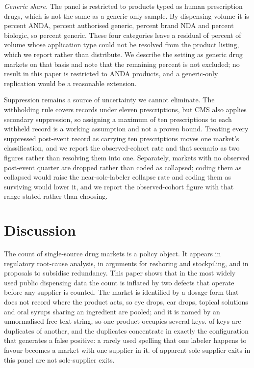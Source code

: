 \documentclass[pdflatex,sn-vancouver-num,Numbered]{sn-jnl}
\begin{document}
\emph{Generic share.} The panel is restricted to products typed as human prescription drugs,
which is not the same as a generic-only sample. By dispensing volume it is \nAndaShare percent
ANDA, \nAuthGenShare percent authorised generic, \nBrandShare percent brand NDA and
\nBiologicShare percent biologic, so \nGenericShare percent generic. These four categories leave
a residual of \nTypeResidual percent of volume whose application type could not be resolved from
the product listing, which we report rather than distribute. We describe the setting as generic
drug markets on that basis and note that the remaining \nNonGeneric percent is not excluded; no
result in this paper is restricted to ANDA products, and a generic-only replication would be a
reasonable extension.

Suppression remains a source of uncertainty we cannot eliminate. The withholding rule covers
records under eleven prescriptions, but CMS also applies secondary suppression, so assigning a
maximum of ten prescriptions to each withheld record is a working assumption and not a proven
bound. Treating every suppressed post-event record as carrying ten prescriptions moves one
market's classification, and we report the observed-cohort rate and that scenario as two figures
rather than resolving them into one. Separately, markets with no observed post-event quarter are
dropped rather than coded as collapsed; coding them as collapsed would raise the near-sole-labeler
collapse rate and coding them as surviving would lower it, and we report the observed-cohort
figure with that range stated rather than choosing.

\section{Discussion}\label{sec:discussion}

The count of single-source drug markets is a policy object. It appears in regulatory root-cause
analysis, in arguments for reshoring and stockpiling, and in proposals to subsidise redundancy.
This paper shows that in the most widely used public dispensing data the count is inflated by
two defects that operate before any supplier is counted. The market is identified by a dosage
form that does not record where the product acts, so eye drops, ear drops, topical solutions and
oral syrups sharing an ingredient are pooled; and it is named by an unnormalised free-text
string, so one product occupies several keys. \nKeysAbsorbed of \nRawKeys keys are duplicates
of another, and the duplicates concentrate in exactly the configuration that generates a false
positive: a rarely used spelling that one labeler happens to favour becomes a market with one
supplier in it. \nReclassSoleUC of \nRawSoleW apparent sole-supplier exits in this panel are not sole-supplier
exits.
\end{document}
